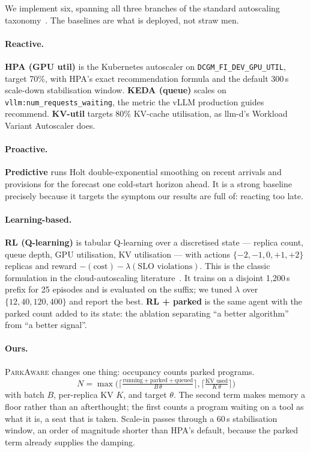 \documentclass[sigconf,nonacm]{acmart}
\newcommand{\sys}{\textsc{ParkAware}\xspace}
\newcommand{\code}[1]{\texttt{\small #1}}
\begin{document}
We implement six, spanning all three branches of the standard autoscaling
taxonomy~\cite{gari}. The baselines are what is deployed, not straw men.

\paragraph{Reactive.}
\textbf{HPA (GPU util)} is the Kubernetes autoscaler on
\code{DCGM\_FI\_DEV\_GPU\_UTIL}, target 70\%, with HPA's exact
recommendation formula and the default 300\,s scale-down stabilisation
window. \textbf{KEDA (queue)} scales on
\code{vllm:num\_requests\_waiting}, the metric the vLLM production guides
recommend. \textbf{KV-util} targets 80\% KV-cache utilisation, as llm-d's
Workload Variant Autoscaler does.

\paragraph{Proactive.}
\textbf{Predictive} runs Holt double-exponential smoothing on recent
arrivals and provisions for the forecast one cold-start horizon ahead. It
is a strong baseline precisely because it targets the symptom our results
are full of: reacting too late.

\paragraph{Learning-based.}
\textbf{RL (Q-learning)} is tabular Q-learning over a discretised state
--- replica count, queue depth, GPU utilisation, KV utilisation --- with
actions $\{-2,-1,0,+1,+2\}$ replicas and reward
$-(\text{cost}) - \lambda(\text{SLO violations})$. This is the classic
formulation in the cloud-autoscaling literature~\cite{barrett,gari}. It
trains on a disjoint 1{,}200\,s prefix for 25 episodes and is evaluated on
the suffix; we tuned $\lambda$ over $\{12,40,120,400\}$ and report the
best. \textbf{RL + parked} is the same agent with the parked count added
to its state: the ablation separating ``a better algorithm'' from ``a
better signal''.

\paragraph{Ours.}
\sys changes one thing: occupancy counts parked programs.
\begin{equation}
N = \max\!\Big(
\Big\lceil \tfrac{\text{running}+\text{parked}+\text{queued}}{B\,\theta}\Big\rceil,
\Big\lceil \tfrac{\text{KV used}}{K\,\theta}\Big\rceil \Big)
\label{eq:policy}
\end{equation}
with batch $B$, per-replica KV $K$, and target $\theta$. The second term
makes memory a floor rather than an afterthought; the first counts a
program waiting on a tool as what it is, a seat that is taken. Scale-in
passes through a 60\,s stabilisation window, an order of magnitude shorter
than HPA's default, because the parked term already supplies the damping.
\end{document}
